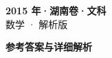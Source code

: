 \documentclass[zihao=-4, a4paper]{ctexart}
\begin{document}
\begin{center}
  {\Large\bfseries 2015 年·湖南卷·文科}\\[4pt]
  {\large 数学 · 解析版}
\end{center}
\medskip
{}

\clearpage
{}
\begin{center}{\Large\bfseries 参考答案与详细解析}\end{center}
\medskip

\end{document}
